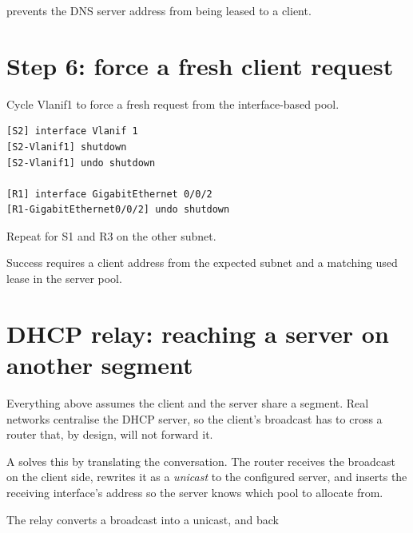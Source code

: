 \begin{keyidea}
 prevents the DNS server address from being leased to a client.
\end{keyidea}

\section{Step 6: force a fresh client request}
Cycle Vlanif1 to force a fresh request from the interface-based pool.
\begin{lstlisting}[style=dcnterminal]
[S2] interface Vlanif 1
[S2-Vlanif1] shutdown
[S2-Vlanif1] undo shutdown

[R1] interface GigabitEthernet 0/0/2
[R1-GigabitEthernet0/0/2] undo shutdown
\end{lstlisting}
Repeat for S1 and R3 on the other subnet.

\begin{verification}
Success requires a client address from the expected subnet and a matching used lease in the server pool.
\end{verification}

\section{DHCP relay: reaching a server on another segment}\label{sec:dhcp-relay}

Everything above assumes the client and the server share a segment. Real networks centralise the DHCP server, so the client's broadcast has to cross a router that, by design, will not forward it.

A  solves this by translating the conversation. The router receives the broadcast on the client side, rewrites it as a \emph{unicast} to the configured server, and inserts the receiving interface's address so the server knows which pool to allocate from.

\begin{netfigure}{The relay converts a broadcast into a unicast, and back}
\end{netfigure}


